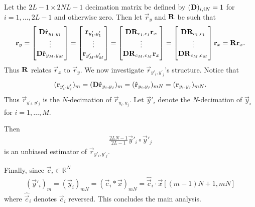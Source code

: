 \documentclass[a4paper, openany, oneside]{memoir}
\begin{document}
Let the $2L-1\times 2NL-1$ decimation matrix be defined by $(\boldsymbol{\mathbf{D}})_{i,iN} = 1$ for $i=1,\ldots,2L-1$ and otherwise zero. Then let $\vec{r}_y$ and $\boldsymbol{\mathbf{R}}$ be such that
\begin{align*}
    \boldsymbol{\mathbf{r}}_y
    = \begin{bmatrix}
        \boldsymbol{\mathbf{D}}\hat{\boldsymbol{\mathbf{r}}}_{y_1,y_1} \\
        \vdots \\
        \boldsymbol{\mathbf{D}}\hat{\boldsymbol{\mathbf{r}}}_{y_M,y_M}
    \end{bmatrix}
    = \begin{bmatrix}
        \boldsymbol{\mathbf{r}}_{y'_1,y'_1} \\
        \vdots \\
        \boldsymbol{\mathbf{r}}_{y'_M,y'_M}
    \end{bmatrix}
    = \begin{bmatrix}
        \boldsymbol{\mathbf{D}}\boldsymbol{\mathbf{R}}_{c_1,c_1} \boldsymbol{\mathbf{r}}_x \\
        \vdots \\
        \boldsymbol{\mathbf{D}}\boldsymbol{\mathbf{R}}_{c_M,c_M} \boldsymbol{\mathbf{r}}_x
    \end{bmatrix}
    = \begin{bmatrix}
        \boldsymbol{\mathbf{D}}\boldsymbol{\mathbf{R}}_{c_1,c_1}\\
        \vdots \\
        \boldsymbol{\mathbf{D}}\boldsymbol{\mathbf{R}}_{c_M,c_M}
    \end{bmatrix} \boldsymbol{\mathbf{r}}_x
    = \boldsymbol{\mathbf{R}} \boldsymbol{\mathbf{r}}_x.
\end{align*}
Thus $\boldsymbol{\mathbf{R}}$ relates $\vec{r}_x$ to $\vec{r}_y$. We now investigate $\vec{r}_{y'_i,y'_j}$'s structure. Notice that
\begin{align*}
    (\boldsymbol{\mathbf{r}}_{y'_i,y'_j})_m = (\boldsymbol{\mathbf{D}} \hat{\boldsymbol{\mathbf{r}}}_{y_i,y_j})_{m} = (\hat{\boldsymbol{\mathbf{r}}}_{y_i,y_j})_{mN} = (\boldsymbol{\mathbf{r}}_{y_i,y_j})_{mN}.
\end{align*}
Thus $\vec{r}_{y'_i,y'_j}$ is the $N$-decimation of $\vec{r}_{y_i,y_j}$. Let $\vec{y}'_i$ denote the $N$-decimation of $\vec{y}_i$ for $i = 1, \ldots, M$.
\begin{theorem} \label{th:deci-corr}
   Then
    \begin{align*}
        \frac{2LN-1}{2L-1}\vec{y}'_i \circ \vec{y}'_j
    \end{align*}
   is an unbiased estimator of $\vec{r}_{y'_i,y'_j}$.
\end{theorem}
Finally, since $\vec{c}_i \in \mathbb{R}^N$
\begin{align*}
    (\vec{y}'_i)_m = (\vec{y}_i)_{mN} = (\vec{c}_i \ast \vec{x})_{mN} = \hat{\vec{c}}_i \cdot \vec{x}[(m-1)N+1,mN]
\end{align*}
where $\hat{\vec{c}}_i$ denotes $\vec{c}_i$ reversed. This concludes the main analysis.
\end{document}
